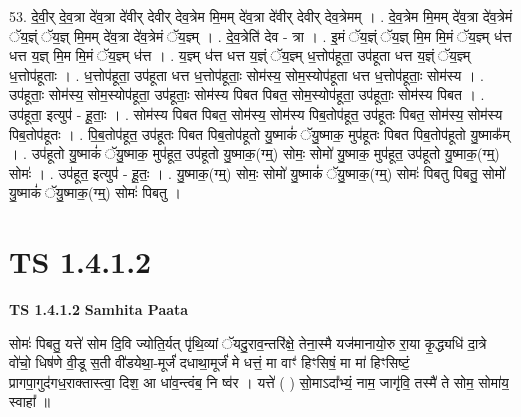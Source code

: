 \documentclass[17pt]{extarticle}
\begin{document}
53. दे॒वी॒र् दे॒व॒त्रा दे॑व॒त्रा दे॑वीर् देवीर् देव॒त्रेम मि॒मम् दे॑व॒त्रा दे॑वीर् देवीर् देव॒त्रेमम् । . दे॒व॒त्रेम मि॒मम् दे॑व॒त्रा दे॑व॒त्रेमं ॅय॒ज्ञ्ं ॅय॒ज्ञ् मि॒मम् दे॑व॒त्रा दे॑व॒त्रेमं ॅय॒ज्ञ्म् । . दे॒व॒त्रेति॑ देव - त्रा । . इ॒मं ॅय॒ज्ञ्ं ॅय॒ज्ञ् मि॒म मि॒मं ॅय॒ज्ञ्म् ध॑त्त धत्त य॒ज्ञ् मि॒म मि॒मं ॅय॒ज्ञ्म् ध॑त्त । . य॒ज्ञ्म् ध॑त्त धत्त य॒ज्ञ्ं ॅय॒ज्ञ्म् ध॒त्तोप॑हूता॒ उप॑हूता धत्त य॒ज्ञ्ं ॅय॒ज्ञ्म् ध॒त्तोप॑हूताः । . ध॒त्तोप॑हूता॒ उप॑हूता धत्त ध॒त्तोप॑हूताः॒ सोम॑स्य॒ सोम॒स्योप॑हूता धत्त ध॒त्तोप॑हूताः॒ सोम॑स्य । . उप॑हूताः॒ सोम॑स्य॒ सोम॒स्योप॑हूता॒ उप॑हूताः॒ सोम॑स्य पिबत पिबत॒ सोम॒स्योप॑हूता॒ उप॑हूताः॒ सोम॑स्य पिबत । . उप॑हूता॒ इत्युप॑ - हू॒ताः॒ । . सोम॑स्य पिबत पिबत॒ सोम॑स्य॒ सोम॑स्य पिब॒तोप॑हूत॒ उप॑हूतः पिबत॒ सोम॑स्य॒ सोम॑स्य पिब॒तोप॑हूतः । . पि॒ब॒तोप॑हूत॒ उप॑हूतः पिबत पिब॒तोप॑हूतो यु॒ष्माकं॑ ॅयु॒ष्माक॒ मुप॑हूतः पिबत पिब॒तोप॑हूतो यु॒ष्माक᳚म् । . उप॑हूतो यु॒ष्माकं॑ ॅयु॒ष्माक॒ मुप॑हूत॒ उप॑हूतो यु॒ष्माक॒(ग्म्॒) सोमः॒ सोमो॑ यु॒ष्माक॒ मुप॑हूत॒ उप॑हूतो यु॒ष्माक॒(ग्म्॒) सोमः॑ । . उप॑हूत॒ इत्युप॑ - हू॒तः॒ । . यु॒ष्माक॒(ग्म्॒) सोमः॒ सोमो॑ यु॒ष्माकं॑ ॅयु॒ष्माक॒(ग्म्॒) सोमः॑ पिबतु पिबतु॒ सोमो॑ यु॒ष्माकं॑ ॅयु॒ष्माक॒(ग्म्॒) सोमः॑ पिबतु । \newline
\pagebreak
{}
\section*{ TS 1.4.1.2 }

\textbf{TS 1.4.1.2 } \newline
\textbf{Samhita Paata} \newline

सोमः॑ पिबतु॒ यत्ते॑ सोम दि॒वि ज्योति॒र्यत् पृ॑थि॒व्यां ॅयदु॒राव॒न्तरि॑क्षे॒ तेना॒स्मै यज॑मानायो॒रु रा॒या कृ॒द्ध्यधि॑ दा॒त्रे वो॑चो॒ धिष॑णे वी॒डू स॒ती वी॑डयेथा॒-मूर्जं॑ दधाथा॒मूर्जं॑ मे धत्तं॒ मा वाꣳ॑ हिꣳसिषं॒ मा मा॑ हिꣳसिष्टं॒ प्रागपा॒गुद॑गध॒राक्तास्त्वा॒ दिश॒ आ धा॑व॒न्त्वंब॒ नि ष्व॑र । यत्ते॑ ( ) सो॒माऽदा᳚भ्यं॒ नाम॒ जागृ॑वि॒ तस्मै॑ ते सोम॒ सोमा॑य॒ स्वाहा᳚ ॥ \newline
\end{document}
